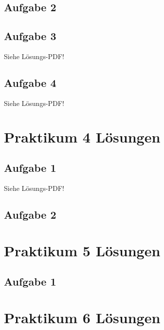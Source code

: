 \documentclass{scrartcl}
\newcommand{\basepath}{praktika/}
\begin{document}
\subsection{Aufgabe 2}



\subsection{Aufgabe 3}
Siehe Lösungs-PDF!
\subsection{Aufgabe 4}
Siehe Lösungs-PDF!





\section{Praktikum 4 Lösungen}
\subsection{Aufgabe 1}
Siehe Lösungs-PDF!
\subsection{Aufgabe 2}





\section{Praktikum 5 Lösungen}
\subsection{Aufgabe 1}







\section{Praktikum 6 Lösungen}



\end{document}
